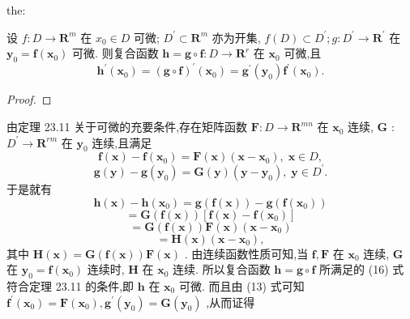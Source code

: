 \begin{theorem}{}{the:}

\end{theorem}
 设 \(f : D \rightarrow  {\mathbf{R}}^{m}\) 在 \({x}_{0} \in  D\) 可微; \({D}^{\prime } \subset  {\mathbf{R}}^{m}\) 亦为开集, \(f\left( D\right)  \subset  {D}^{\prime };g : {D}^{\prime } \rightarrow  {\mathbf{R}}^{\prime }\) 在 \({\mathbf{y}}_{0} = \mathbf{f}\left( {\mathbf{x}}_{0}\right)\) 可微. 则复合函数 \(\mathbf{h} = \mathbf{g} \circ  \mathbf{f} : D \rightarrow  {\mathbf{R}}^{r}\) 在 \({\mathbf{x}}_{0}\) 可微,且
\[
{\mathbf{h}}^{\prime }\left( {\mathbf{x}}_{0}\right)  = {\left( \mathbf{g} \circ  \mathbf{f}\right) }^{\prime }\left( {\mathbf{x}}_{0}\right)  = {\mathbf{g}}^{\prime }\left( {\mathbf{y}}_{0}\right) {\mathbf{f}}^{\prime }\left( {\mathbf{x}}_{0}\right) . \tag{15}
\]
\begin{proof}

\end{proof}
由定理 23.11 关于可微的充要条件,存在矩阵函数 \(\mathbf{F} : D \rightarrow  {\mathbf{R}}^{mn}\) 在 \({\mathbf{x}}_{0}\) 连续, \(\mathbf{G}\) : \({D}^{\prime } \rightarrow  {\mathbf{R}}^{rm}\) 在 \({\mathbf{y}}_{0}\) 连续,且满足
\[
\mathbf{f}\left( \mathbf{x}\right)  - \mathbf{f}\left( {\mathbf{x}}_{0}\right)  = \mathbf{F}\left( \mathbf{x}\right) \left( {\mathbf{x} - {\mathbf{x}}_{0}}\right) ,\;\mathbf{x} \in  D,
\]
\[
\mathbf{g}\left( \mathbf{y}\right)  - \mathbf{g}\left( {\mathbf{y}}_{0}\right)  = \mathbf{G}\left( \mathbf{y}\right) \left( {\mathbf{y} - {\mathbf{y}}_{0}}\right) ,\;\mathbf{y} \in  {D}^{\prime }.
\]
于是就有
\[
\mathbf{h}\left( \mathbf{x}\right)  - \mathbf{h}\left( {\mathbf{x}}_{0}\right)  = \mathbf{g}\left( {\mathbf{f}\left( \mathbf{x}\right) }\right)  - \mathbf{g}\left( {\mathbf{f}\left( {\mathbf{x}}_{0}\right) }\right)
\]
\[
= \mathbf{G}\left( {\mathbf{f}\left( \mathbf{x}\right) }\right) \left\lbrack  {\mathbf{f}\left( \mathbf{x}\right)  - \mathbf{f}\left( {\mathbf{x}}_{0}\right) }\right\rbrack
\]
\[
= \mathbf{G}\left( {\mathbf{f}\left( \mathbf{x}\right) }\right) \mathbf{F}\left( \mathbf{x}\right) \left( {\mathbf{x} - {\mathbf{x}}_{0}}\right)
\]
\[
= \mathbf{H}\left( \mathbf{x}\right) \left( {\mathbf{x} - {\mathbf{x}}_{0}}\right) , \tag{16}
\]
其中 \(\mathbf{H}\left( \mathbf{x}\right)  = \mathbf{G}\left( {\mathbf{f}\left( \mathbf{x}\right) }\right) \mathbf{F}\left( \mathbf{x}\right)\) . 由连续函数性质可知,当 \(\mathbf{f},\mathbf{F}\) 在 \({\mathbf{x}}_{0}\) 连续, \(\mathbf{G}\) 在 \({\mathbf{y}}_{0} = \mathbf{f}\left( {\mathbf{x}}_{0}\right)\) 连续时, \(\mathbf{H}\) 在 \({\mathbf{x}}_{0}\) 连续. 所以复合函数 \(\mathbf{h} = \mathbf{g} \circ  \mathbf{f}\) 所满足的 (16) 式符合定理 23.11 的条件,即 \(\mathbf{h}\) 在 \({\mathbf{x}}_{0}\) 可微. 而且由 (13) 式可知 \({\mathbf{f}}^{\prime }\left( {\mathbf{x}}_{0}\right)  = \mathbf{F}\left( {\mathbf{x}}_{0}\right) ,{\mathbf{g}}^{\prime }\left( {\mathbf{y}}_{0}\right)  = \mathbf{G}\left( {\mathbf{y}}_{0}\right)\) ,从而证得
